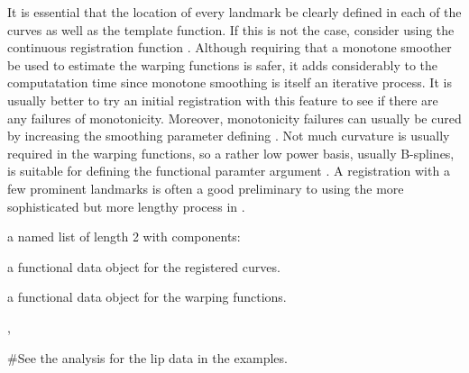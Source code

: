 \documentclass{article}
\begin{document}
\begin{Details}\relax
It is essential that the location of every landmark be clearly defined
in each of the curves as well as the template function.  If this is
not the case, consider using the continuous registration function
.  Although requiring that a monotone smoother be
used to estimate the warping functions is safer, it adds considerably
to the computatation time since monotone smoothing is itself an
iterative process.  It is usually better to try an initial
registration with this feature to see if there are any failures of
monotonicity.  Moreover, monotonicity failures can usually be cured
by increasing the smoothing parameter defining .  Not
much curvature is usually required in the warping functions, so a
rather low power basis, usually B-splines, is suitable for defining
the functional paramter argument .  A registration with
a few prominent landmarks is often a good preliminary to using the
more sophisticated but more lengthy process in .
\end{Details}
\begin{Value}
a named list of length 2 with components:

\begin{ldescription}
\item[\code{fdreg}] a functional data object for the registered curves.

\item[\code{warpfd}] a functional data object for the warping functions.

\end{ldescription}
\end{Value}
\begin{SeeAlso}\relax
{},
\end{SeeAlso}
\begin{Examples}
\begin{ExampleCode}
#See the analysis for the lip data in the examples.
\end{ExampleCode}
\end{Examples}
\end{document}
